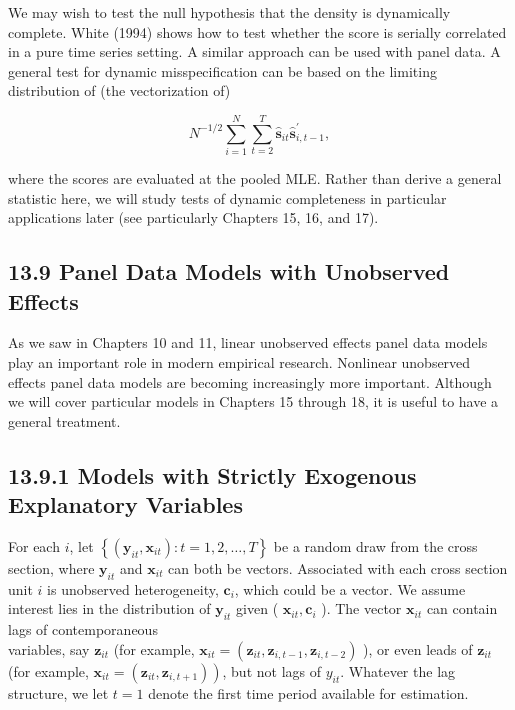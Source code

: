 \documentclass[10pt]{article}
\begin{document}
We may wish to test the null hypothesis that the density is dynamically complete. White (1994) shows how to test whether the score is serially correlated in a pure time series setting. A similar approach can be used with panel data. A general test for dynamic misspecification can be based on the limiting distribution of (the vectorization of)

$$
N^{-1 / 2} \sum_{i=1}^{N} \sum_{t=2}^{T} \hat{\mathbf{s}}_{i t} \hat{\mathbf{s}}_{i, t-1}^{\prime},
$$

where the scores are evaluated at the pooled MLE. Rather than derive a general statistic here, we will study tests of dynamic completeness in particular applications later (see particularly Chapters 15, 16, and 17).

\subsection*{13.9 Panel Data Models with Unobserved Effects}
As we saw in Chapters 10 and 11, linear unobserved effects panel data models play an important role in modern empirical research. Nonlinear unobserved effects panel data models are becoming increasingly more important. Although we will cover particular models in Chapters 15 through 18, it is useful to have a general treatment.

\subsection*{13.9.1 Models with Strictly Exogenous Explanatory Variables}
For each $i$, let $\left\{\left(\mathbf{y}_{i t}, \mathbf{x}_{i t}\right): t=1,2, \ldots, T\right\}$ be a random draw from the cross section, where $\mathbf{y}_{i t}$ and $\mathbf{x}_{i t}$ can both be vectors. Associated with each cross section unit $i$ is unobserved heterogeneity, $\mathbf{c}_{i}$, which could be a vector. We assume interest lies in the distribution of $\mathbf{y}_{i t}$ given ( $\mathbf{x}_{i t}, \mathbf{c}_{i}$ ). The vector $\mathbf{x}_{i t}$ can contain lags of contemporaneous\\
variables, say $\mathbf{z}_{i t}$ (for example, $\mathbf{x}_{i t}=\left(\mathbf{z}_{i t}, \mathbf{z}_{i, t-1}, \mathbf{z}_{i, t-2}\right)$ ), or even leads of $\mathbf{z}_{i t}$ (for example, $\left.\mathbf{x}_{i t}=\left(\mathbf{z}_{i t}, \mathbf{z}_{i, t+1}\right)\right)$, but not lags of $y_{i t}$. Whatever the lag structure, we let $t=1$ denote the first time period available for estimation.
\end{document}
